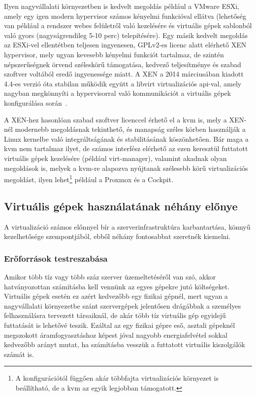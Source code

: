 Ilyen nagyvállalati környezetben is kedvelt megoldás például a VMware ESXi, amely egy igen modern hypervisor számos kényelmi funkcióval ellátva (lehetőség van például a rendszer webes felületről való kezelésére és virtuális gépek sablonból való gyors (nagyságrendileg 5-10 perc) telepítésére).
Egy másik kedvelt megoldás az ESXi-vel ellentétben teljesen ingyenesen, GPLv2-es licenc alatt elérhető XEN hypervisor, mely ugyan kevesebb kényelmi funkciót tartalmaz, de szintén népszerűségnek örvend széleskörű támogatása, kedvező teljesítménye és szabad szoftver voltából eredő ingyenessége miatt. A XEN a 2014 márciusában kiadott 4.4-es verzió óta stabilan működik együtt a libvirt virtualizációs \acrshort{api}-val, amely nagyban megkönnyíti a hypervisorral való kommunikációt a virtuális gépek konfigurálása során~\cite{Xen44ReleaseNotes}.

A XEN-hez hasonlóan szabad szoftver licenccel érhető el a \acrfull{kvm} is, mely a XEN-nél modernebb megoldásnak tekinthető, és manapság széles körben használják a Linux kernelbe való integráltságának és stabilitásának köszönhetően. Bár maga a \acrshort{kvm} nem tartalmaz ilyet, de számos interfész elérhető az ezen keresztül futtatott virtuális gépek kezelésére (például virt-manager), valamint akadnak olyan megoldások is, melyek a \acrshort{kvm}-re alapozva nyújtanak szélesebb körű virtualizációs megoldást, ilyen lehet\footnote{A konfigurációtól függően akár többfajta virtualizációs környezet is beállítható, de a \acrshort{kvm} az egyik legjobban támogatott.} például a Proxmox és a Cockpit.


\subsection{Virtuális gépek használatának néhány előnye}
A virtualizáció számos előnnyel bír a szerverinfrastruktúra karbantartása, könnyű kezelhetősége szempontjából, ebből néhány fontosabbat szeretnék kiemelni.

\subsubsection{Erőforrások testreszabása}
Amikor több tíz vagy több száz szerver üzemeltetéséről van szó, akkor hatványozottan számításba kell vennünk az egyes gépekre jutó költségeket. Virtuális gépek esetén ez azért kedvezőbb egy fizikai gépnél, mert ugyan a nagyvállalati környezetbe szánt szervergépek jelentősen drágábbak a személyes felhasználásra tervezett társaiknál, de akár több tíz virtuális gép egyidejű futtatását is lehetővé teszik. Ezáltal az egy fizikai gépre eső, asztali gépeknél megszokott áramfogyasztáshoz képest jóval nagyobb energiafelvétel sokkal kedvezőbb arányt mutat, ha számításba vesszük a futtatott virtuális kiszolgálók számát is.

